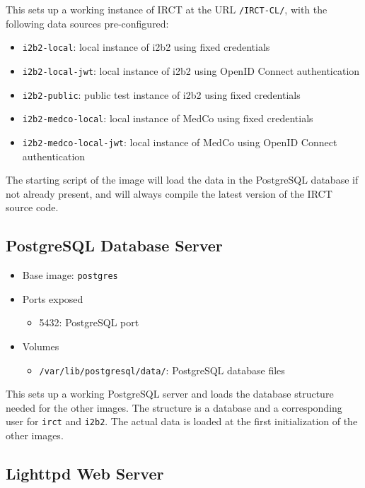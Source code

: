 This sets up a working instance of IRCT at the URL \verb|/IRCT-CL/|, with the following data sources pre-configured:
\begin{itemize}
    \item \verb|i2b2-local|: local instance of i2b2 using fixed credentials
    \item \verb|i2b2-local-jwt|: local instance of i2b2 using OpenID Connect authentication
    \item \verb|i2b2-public|: public test instance of i2b2 using fixed credentials
    \item \verb|i2b2-medco-local|: local instance of MedCo using fixed credentials
    \item \verb|i2b2-medco-local-jwt|: local instance of MedCo using OpenID Connect authentication
\end{itemize}

The starting script of the image will load the data in the PostgreSQL database if not already present, and will always compile the latest version of the IRCT source code.



\subsection{PostgreSQL Database Server}

\begin{itemize}
    \item Base image: \verb|postgres|
    \item Ports exposed
        \begin{itemize}
        \item 5432: PostgreSQL port
        \end{itemize}
        
    \item Volumes
        \begin{itemize}
        \item \verb|/var/lib/postgresql/data/|: PostgreSQL database files
        \end{itemize}
\end{itemize}

This sets up a working PostgreSQL server and loads the database structure needed for the other images.
The structure is a database and a corresponding user for \verb|irct| and \verb|i2b2|.
The actual data is loaded at the first initialization of the other images.


\subsection{Lighttpd Web Server}

